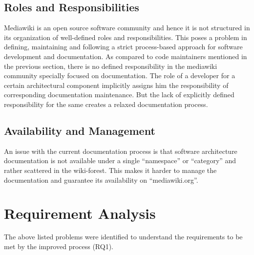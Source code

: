 \subsection{Roles and Responsibilities}
\indent Mediawiki is an open source software community and hence it is not structured in its organization of well-defined roles and responsibilities. This poses a problem in defining, maintaining and following a strict process-based approach for software development and documentation. As compared to code maintainers mentioned in the previous section, there is no defined responsibility in the mediawiki community specially focused on documentation. The role of a developer for a certain architectural component implicitly assigns him the responsibility of corresponding documentation maintenance. But the lack of explicitly defined responsibility for the same creates a relaxed documentation process.
\subsection{Availability and Management}
\indent An issue with the current documentation process is that software architecture documentation is not available under a single \enquote{namespace} or \enquote{category} and rather scattered in the wiki-forest. This makes it harder to manage the documentation and guarantee its availability on \enquote{mediawiki.org}.
\section{Requirement Analysis}
\indent The above listed problems were identified to understand the requirements to be met by the improved process (RQ1).
